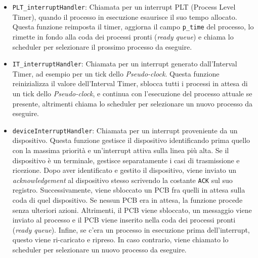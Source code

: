 \documentclass[a4paper]{article}
\begin{document}
\begin{itemize}
\item \verb+PLT_interruptHandler+: Chiamata per un interrupt PLT (Process Level Timer), quando il processo in esecuzione esaurisce il suo tempo allocato. Questa funzione reimposta il timer, aggiorna il campo \verb+p_time+ del processo, lo rimette in fondo alla coda dei processi pronti (\textit{ready queue}) e chiama lo scheduler per selezionare il prossimo processo da eseguire.

\item \texttt{IT\_interruptHandler}: Chiamata per un interrupt generato dall'Interval Timer, ad esempio per un tick dello \textit{Pseudo-clock}. Questa funzione reinizializza il valore dell'Interval Timer, sblocca tutti i processi in attesa di un tick dello \textit{Pseudo-clock}, e continua con l'esecuzione del processo attuale se presente, altrimenti chiama lo scheduler per selezionare un nuovo processo da eseguire.

\item \texttt{deviceInterruptHandler}: Chiamata per un interrupt proveniente da un dispositivo. Questa funzione gestisce il dispositivo identificando prima quello con la massima priorità e un'interrupt attiva sulla linea più alta. Se il dispositivo è un terminale, gestisce separatamente i casi di trasmissione e ricezione. Dopo aver identificato e gestito il dispositivo, viene inviato un \textit{acknowledgement} al dispositivo stesso scrivendo la costante \texttt{ACK} sul suo registro. Successivamente, viene sbloccato un PCB fra quelli in attesa sulla coda di quel dispositivo. Se nessun PCB era in attesa, la funzione procede senza ulteriori azioni. Altrimenti, il PCB viene sbloccato, un messaggio viene inviato al processo e il PCB viene inserito nella coda dei processi pronti (\textit{ready queue}). Infine, se c'era un processo in esecuzione prima dell'interrupt, questo viene ri-caricato e ripreso. In caso contrario, viene chiamato lo scheduler per selezionare un nuovo processo da eseguire.

\end{itemize}
\end{document}
